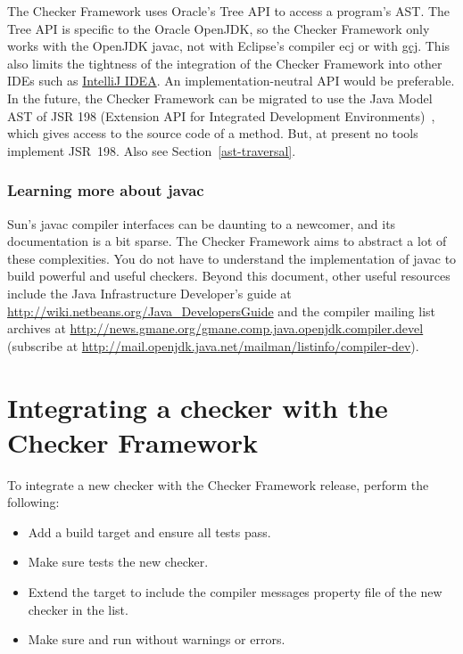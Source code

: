 The Checker Framework uses Oracle's Tree API to access a program's AST\@.
The Tree API is specific to the Oracle OpenJDK, so the Checker Framework only
works with the OpenJDK javac, not with Eclipse's compiler ecj or with
\href{http://gcc.gnu.org/java/}{gcj}.  This also limits the tightness of
the integration of the Checker Framework into other IDEs such as \href{http://www.jetbrains.com/idea/}{IntelliJ IDEA}\@.
An implementation-neutral API would be preferable.
In the future, the Checker Framework
can be migrated to use the Java Model AST of JSR 198 (Extension API for
Integrated Development Environments)~\cite{JSR198}, which gives access to
the source code of a method.  But, at present no tools
implement JSR~198.  Also see Section~\ref{ast-traversal}.



\subsubsection{Learning more about javac\label{learning-more-about-javac}}

Sun's javac compiler interfaces can be daunting to a
newcomer, and its documentation is a bit sparse. The Checker Framework
aims to abstract a lot of these complexities.
You do not have to understand the implementation of javac to
build powerful and useful checkers.
Beyond this document,
other useful resources include the Java Infrastructure
Developer's guide at
\url{http://wiki.netbeans.org/Java_DevelopersGuide} and the compiler
mailing list archives at
\url{http://news.gmane.org/gmane.comp.java.openjdk.compiler.devel}
(subscribe at
\url{http://mail.openjdk.java.net/mailman/listinfo/compiler-dev}).


\section{Integrating a checker with the Checker Framework\label{integrating-a-checker}}


To integrate a new checker with the Checker Framework release, perform
the following:

\begin{itemize}

\item Add a  build target and ensure all tests pass.

\item Make sure  tests the new checker.

\item Extend the  target to include the
compiler messages property file of the new checker in
the  list.

\item Make sure  and  run
without warnings or errors.

\end{itemize}


